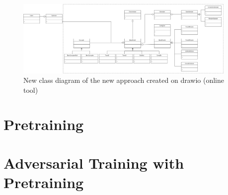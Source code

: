 \begin{figure}
  \centering
    \includegraphics[width=0.95\textwidth]{appendices/figures/NewClassDiagram.drawio.png}
  \caption{New class diagram of the new approach created on drawio (online tool)}
  \label{fig:overview}
\end{figure}




\section{Pretraining}
\label{app:sec:pretraining}



\section{Adversarial Training with Pretraining}
\label{app:sec:adv_training}





